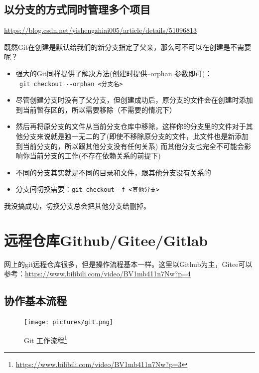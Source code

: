 \subsection{以分支的方式同时管理多个项目}
\url{https://blog.csdn.net/yishengzhiai005/article/details/51096813}

既然Git在创建是默认给我们的新分支指定了父亲，那么可不可以在创建是不需要呢？

\begin{itemize}
\item 强大的Git同样提供了解决方法(创建时提供--orphan 参数即可)：\\
\verb| git checkout --orphan <分支名>|
\item 尽管创建分支时没有了父分支，但创建成功后，原分支的文件会在创建时添加到当前暂存区的，所以需要移除（不需要的情况下）
\item 然后再将原分支的文件从当前分支仓库中移除，这样你的分支里的文件对于其他分支来说就是独一无二的了(即使不移除原分支的文件，此文件也是新添加到当前分支的，所以跟其他分支没有任何关系)
而其他分支也完全不可能会影响你当前分支的工作(不存在依赖关系的前提下)
\item 不同的分支其实就是不同的目录和文件，跟其他分支没有关系的
\item 分支间切换需要：\verb|git checkout -f <其他分支>|
\end{itemize}

{\color{red} 我没搞成功，切换分支总会把其他分支给删掉。}




\section{远程仓库Github/Gitee/Gitlab}
网上的git远程仓库很多，但是操作流程基本一样。这里以Github为主，Gitee可以参考：\url{https://www.bilibili.com/video/BV1mb411n7Nw?p=4}


\subsection{协作基本流程}
\begin{figure}[h!]
\centering
\texttt{[image: pictures/git.png]}
\caption{Git 工作流程\footnote{\url{https://www.bilibili.com/video/BV1mb411n7Nw?p=3}}}
\end{figure}

